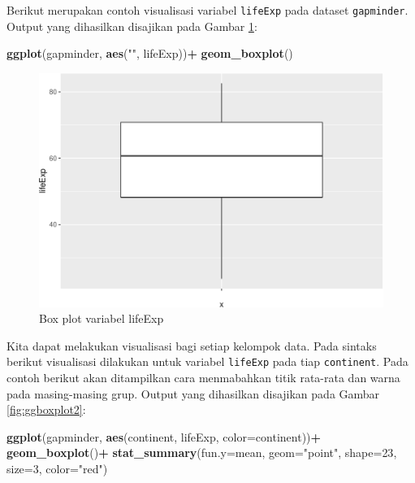 \documentclass[]{book}
\newenvironment{Shaded}{\begin{snugshade}}{\end{snugshade}}
\newcommand{\KeywordTok}[1]{\textcolor[rgb]{0.13,0.29,0.53}{\textbf{#1}}}
\newcommand{\DataTypeTok}[1]{\textcolor[rgb]{0.13,0.29,0.53}{#1}}
\newcommand{\DecValTok}[1]{\textcolor[rgb]{0.00,0.00,0.81}{#1}}
\newcommand{\StringTok}[1]{\textcolor[rgb]{0.31,0.60,0.02}{#1}}
\newcommand{\OperatorTok}[1]{\textcolor[rgb]{0.81,0.36,0.00}{\textbf{#1}}}
\newcommand{\NormalTok}[1]{#1}
\begin{document}
Berikut merupakan contoh visualisasi variabel \texttt{lifeExp} pada
dataset \texttt{gapminder}. Output yang dihasilkan disajikan pada Gambar
\ref{fig:ggboxplot}:

\begin{Shaded}
\begin{Highlighting}[]
\KeywordTok{ggplot}\NormalTok{(gapminder, }\KeywordTok{aes}\NormalTok{(}\StringTok{""}\NormalTok{, lifeExp))}\OperatorTok{+}
\StringTok{  }\KeywordTok{geom_boxplot}\NormalTok{()}
\end{Highlighting}
\end{Shaded}

\begin{figure}

{\centering \includegraphics[width=0.7\linewidth]{EnvStat_files/figure-latex/ggboxplot-1} 

}

\caption{Box plot variabel lifeExp}\label{fig:ggboxplot}
\end{figure}

Kita dapat melakukan visualisasi bagi setiap kelompok data. Pada sintaks
berikut visualisasi dilakukan untuk variabel \texttt{lifeExp} pada tiap
\texttt{continent}. Pada contoh berikut akan ditampilkan cara
menmabahkan titik rata-rata dan warna pada masing-masing grup. Output
yang dihasilkan disajikan pada Gambar \ref{fig:ggboxplot2}:

\begin{Shaded}
\begin{Highlighting}[]
\KeywordTok{ggplot}\NormalTok{(gapminder, }\KeywordTok{aes}\NormalTok{(continent, lifeExp, }\DataTypeTok{color=}\NormalTok{continent))}\OperatorTok{+}
\StringTok{  }\KeywordTok{geom_boxplot}\NormalTok{()}\OperatorTok{+}
\StringTok{  }\KeywordTok{stat_summary}\NormalTok{(}\DataTypeTok{fun.y=}\NormalTok{mean, }\DataTypeTok{geom=}\StringTok{"point"}\NormalTok{, }
               \DataTypeTok{shape=}\DecValTok{23}\NormalTok{, }\DataTypeTok{size=}\DecValTok{3}\NormalTok{, }\DataTypeTok{color=}\StringTok{"red"}\NormalTok{)}
\end{Highlighting}
\end{Shaded}
\end{document}
